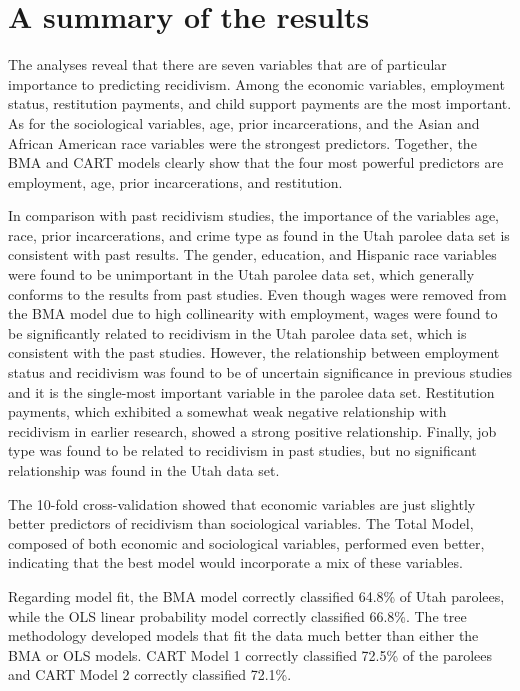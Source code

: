 \section{A summary of the results}

The analyses reveal that there are seven variables that are of particular importance to predicting recidivism.  Among the economic variables, employment status, restitution payments, and child support payments are the most important.  As for the sociological variables, age, prior incarcerations, and the Asian and African American race variables were the strongest predictors.  Together, the BMA and CART models clearly show that the four most powerful predictors are employment, age, prior incarcerations, and restitution.

In comparison with past recidivism studies, the importance of the variables age, race, prior incarcerations, and crime type as found in the Utah parolee data set is consistent with past results.  The gender, education, and Hispanic race variables were found to be unimportant in the Utah parolee data set, which generally conforms to the results from past studies.  Even though wages were removed from the BMA model due to high collinearity with employment, wages were found to be significantly related to recidivism in the Utah parolee data set, which is consistent with the past studies. However, the relationship between employment status and recidivism was found to be of uncertain significance in previous studies and it is the single-most important variable in the parolee data set.  Restitution payments, which exhibited a somewhat weak negative relationship with recidivism in earlier research, showed a strong positive relationship.  Finally, job type was found to be related to recidivism in past studies, but no significant relationship was found in the Utah data set.

The 10-fold cross-validation showed that economic variables are just slightly better predictors of recidivism than sociological variables.  The Total Model, composed of both economic and sociological variables, performed even better, indicating that the best model would incorporate a mix of these variables.

Regarding model fit, the BMA model correctly classified 64.8\% of Utah parolees, while the OLS linear probability model correctly classified 66.8\%.  The tree methodology developed models that fit the data much better than either the BMA or OLS models.  CART Model 1 correctly classified 72.5\% of the parolees and CART Model 2 correctly classified 72.1\%.

